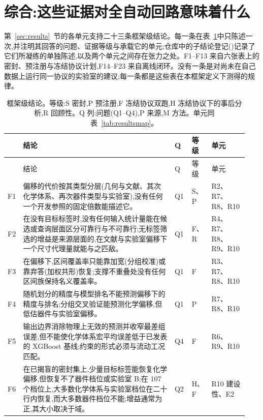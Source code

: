 \documentclass[11pt,a4paper]{ctexart}
\begin{document}
\section{综合:这些证据对全自动回路意味着什么}
\label{sec:synthesis}
第~\ref{sec:results}~节的各单元支持二十三条框架级结论。每一条在表~\ref{tab:findings}中只陈述一次,并注明其回答的问题、证据等级与承载它的单元;仓库中的子结论登记()记录了它们所凝练的单独陈述,以及两个单元之间存在张力之处。F1--F13 来自六张表上的密封、预注册与冻结协议计划,F14--F23 来自离线闭环。没有一条是对尚未在自己数据上运行同一协议的实验室的建议;每一条都是这些表在本框架定义下测得的规律。

{\scriptsize
\setlength{\tabcolsep}{3pt}
\renewcommand{\arraystretch}{0.92}
\setlength{\LTcapwidth}{\linewidth}
\begin{longtable}{@{}p{0.04\linewidth}p{0.625\linewidth}p{0.075\linewidth}p{0.055\linewidth}p{0.15\linewidth}@{}}
\caption{框架级结论。等级:S 密封,P 预注册,F 冻结协议双跑,H 冻结协议下的事后分析,R 回顾性。Q 列:问题(Q1--Q4),P 来源,M 方法。单元同表~\ref{tab:resultsmap}。}
\label{tab:findings}\\
\toprule
 & 结论 & Q & 等级 & 单元 \\
\midrule
\endfirsthead
\toprule
 & 结论 & Q & 等级 & 单元 \\
\midrule
\endhead
\bottomrule
\endlastfoot
F1 & 偏移的代价按其类型分层(几何与文献、其次化学体系、再次器件类型与实验室),没有任何一个开发参照的固定倍数能描述它。 & Q1 & S、P & R2、R7、R8、R10 \\
F2 & 在没有目标标签时,没有任何输入统计量能在候选或查询层面区分可靠行与不可靠行;无标签筛选的增益是来源层面的,在文献与实验室偏移下一个尺寸代理量就能与之匹敌。 & Q1 & F、R & R4、R7、R8、R9、R10 \\
F3 & 在偏移下,区间覆盖率只能靠加宽(分组校准)或靠弃答(加权共形)恢复;支撑不重叠处没有任何区间族保持名义覆盖率。 & Q1 & F & R3、R7、R8、R10 \\
F4 & 随机划分的精度与模型排名不能预测偏移下的精度与排名;分组交叉验证能预测化学偏移,但低估器件与实验室偏移。 & Q1 & P & R7、R8、R10 \\
F5 & 输出边界消除物理上无效的预测并收窄最差组误差,但不能使化学体系宏平均误差低于已发表的 XGBoost 基线;约束的形式必须与流动工况匹配。 & Q4 & F & R6、R9、R10 \\
F6 & 在已揭盲的密封集上,少量目标标签能恢复化学偏移,但恢复不了器件档位或实验室 B;在 107 个档位上,大多数化学体系与实验室档位在二十行内恢复,而大多数器件档位不能;增益通常为正,其大小取决于域。 & Q2 & H、F & R10 建设性、E2 \\

\end{longtable}}
\end{document}
